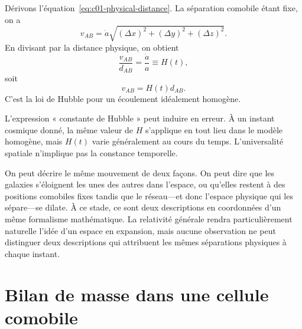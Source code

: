 Dérivons l’équation~\eqref{eq:c01-physical-distance}. La séparation comobile étant fixe, on a
\begin{equation}
v_{AB}=\dot a\sqrt{(\Delta x)^2+(\Delta y)^2+(\Delta z)^2}.
\end{equation}
En divisant par la distance physique, on obtient
\begin{equation}
\frac{v_{AB}}{d_{AB}}=\frac{\dot a}{a}\equiv H(t),
\label{eq:c01-hubble-parameter}
\end{equation}
soit
\begin{equation}
\boxed{v_{AB}=H(t)d_{AB}.}
\label{eq:c01-hubble-law}
\end{equation}
C’est la loi de Hubble pour un écoulement idéalement homogène.

L’expression « constante de Hubble » peut induire en erreur. À un instant cosmique donné, la même valeur de \(H\) s’applique en tout lieu dans le modèle homogène, mais \(H(t)\) varie généralement au cours du temps. L’universalité spatiale n’implique pas la constance temporelle.

\begin{classroomqa}
\end{classroomqa}

On peut décrire le même mouvement de deux façons. On peut dire que les galaxies s’éloignent les unes des autres dans l’espace, ou qu’elles restent à des positions comobiles fixes tandis que le réseau---et donc l’espace physique qui les sépare---se dilate. À ce stade, ce sont deux descriptions en coordonnées d’un même formalisme mathématique. La relativité générale rendra particulièrement naturelle l’idée d’un espace en expansion, mais aucune observation ne peut distinguer deux descriptions qui attribuent les mêmes séparations physiques à chaque instant.

\section{Bilan de masse dans une cellule comobile}

